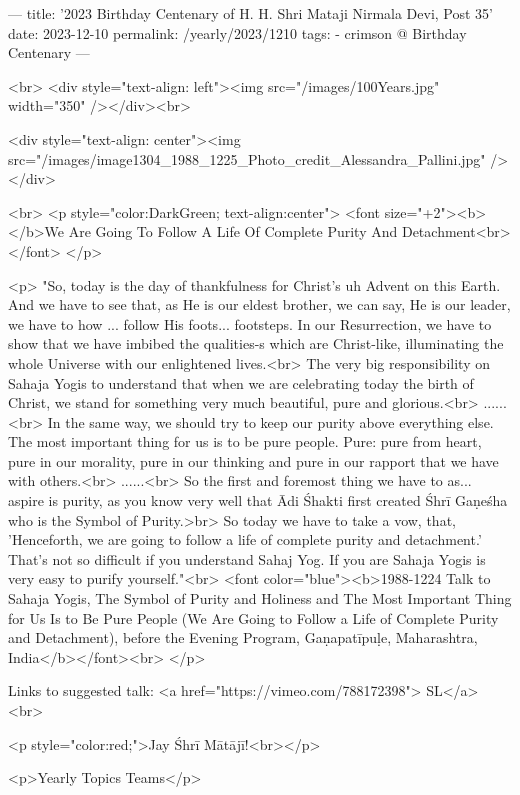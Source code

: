 ---
title: '2023 Birthday Centenary of H. H. Shri Mataji Nirmala Devi, Post 35'
date: 2023-12-10
permalink: /yearly/2023/1210
tags:
  - crimson @ Birthday Centenary
---

<br>
<div style="text-align: left"><img src="/images/100Years.jpg" width="350" /></div><br>

<div style="text-align: center"><img src="/images/image1304_1988_1225_Photo_credit_Alessandra_Pallini.jpg" /></div>

<br>
<p style="color:DarkGreen; text-align:center">
<font size="+2"><b></b>We Are Going To Follow A Life Of Complete Purity And Detachment<br></font>
</p>

<p>
"So, today is the day of thankfulness for Christ's uh Advent on this Earth. And we have to see that, as He is our eldest brother, we can say, He is our leader, we have to how ... follow His foots... footsteps. In our Resurrection, we have to show that we have imbibed the qualities-s which are Christ-like, illuminating the whole Universe with our enlightened lives.<br>
The very big responsibility on Sahaja Yogis to understand that when we are celebrating today the birth of Christ, we stand for something very much beautiful, pure and glorious.<br>
......<br>
In the same way, we should try to keep our purity above everything else. The most important thing for us is to be pure people. Pure: pure from heart, pure in our morality, pure in our thinking and pure in our rapport that we have with others.<br>
......<br>
So the first and foremost thing we have to as... aspire is purity, as you know very well that Ādi Śhakti first created Śhrī Gaṇeśha who is the Symbol of Purity.>br>
So today we have to take a vow, that, 'Henceforth, we are going to follow a life of complete purity and detachment.' That's not so difficult if you understand Sahaj Yog. If you are Sahaja Yogis is very easy to purify yourself."<br>
<font color="blue"><b>1988-1224 Talk to Sahaja Yogis, The Symbol of Purity and Holiness and The Most Important Thing for Us Is to Be Pure People (We Are Going to Follow a Life of Complete Purity and Detachment), before the Evening Program, Gaṇapatīpuḷe, Maharashtra, India</b></font><br>
</p>

Links to suggested talk: <a href="https://vimeo.com/788172398"> SL</a><br>

<p style="color:red;">Jay Śhrī Mātājī!<br></p>

<p>Yearly Topics Teams</p>